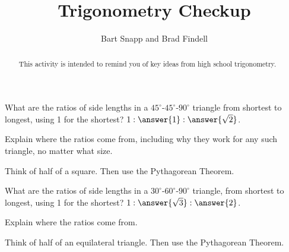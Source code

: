 \documentclass[nooutcomes]{ximera}
\title{Trigonometry Checkup}
\author{Bart Snapp and Brad Findell}
\begin{document}
\begin{abstract}
This activity is intended to remind you of key ideas from high school trigonometry. 
\end{abstract}
\maketitle


\begin{problem}
What are the ratios of side lengths in a $45^\circ$-$45^\circ$-$90^\circ$ triangle from shortest to longest, using 1 for the shortest?  $1: \answer{1} : \answer{\sqrt{2}}$. 

Explain where the ratios come from, including why they work for any such triangle, no matter what size.  
\begin{hint} Think of half of a square.  Then use the Pythagorean Theorem. \end{hint}
\end{problem}


\begin{problem}
What are the ratios of side lengths in a $30^\circ$-$60^\circ$-$90^\circ$ triangle, from shortest to longest, using 1 for the shortest?  $1 : \answer{\sqrt{3}} : \answer{2}$. 

Explain where the ratios come from.  \begin{hint}Think of half of an equilateral triangle.  Then use the Pythagorean Theorem. \end{hint}
\end{problem}
\end{document}
